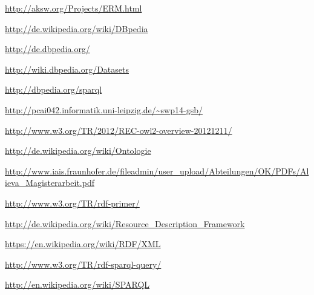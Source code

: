 
\begin{thebibliography}{99}
  \url{http://aksw.org/Projects/ERM.html}

  \url{http://de.wikipedia.org/wiki/DBpedia}

  \url{http://de.dbpedia.org/}

  \url{http://wiki.dbpedia.org/Datasets}

  \url{http://dbpedia.org/sparql}

  \url{http://pcai042.informatik.uni-leipzig.de/~swp14-gsb/}

  \url{http://www.w3.org/TR/2012/REC-owl2-overview-20121211/}

  \url{http://de.wikipedia.org/wiki/Ontologie}

  \url{http://www.iais.fraunhofer.de/fileadmin/user_upload/Abteilungen/OK/PDFs/Alieva_Magisterarbeit.pdf}

  \url{http://www.w3.org/TR/rdf-primer/}

  \url{http://de.wikipedia.org/wiki/Resource_Description_Framework}

  \url{https://en.wikipedia.org/wiki/RDF/XML}

  \url{http://www.w3.org/TR/rdf-sparql-query/}

  \url{http://en.wikipedia.org/wiki/SPARQL}

\end{thebibliography}
